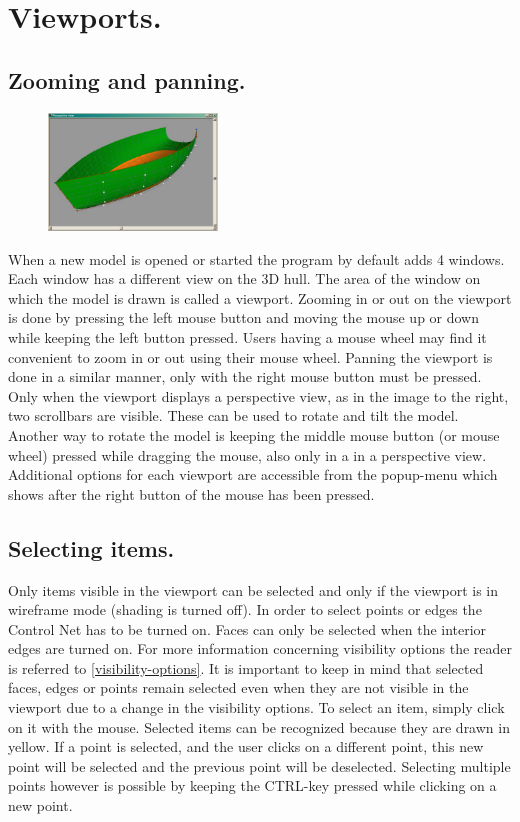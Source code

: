 \documentclass[12pt]{article}
\begin{document}
\section{Viewports.}

\subsection{Zooming and panning.}

\begin{figure}
        \centering
        \includegraphics[width=0.4\textwidth,natwidth=1024,natheight=715]{figure8.png}
        \caption{}
        \label{fig:viewport}
\end{figure}

When a new model is opened or started the program by default adds 4
windows. Each window has a different view on the 3D hull. The area of
the window on which the model is drawn is called a viewport. Zooming
in or out on the viewport is done by pressing the left mouse button
and moving the mouse up or down while keeping the left button pressed.
Users having a mouse wheel may find it convenient to zoom in or out
using their mouse wheel. Panning the viewport is done in a similar
manner, only with the right mouse button must be pressed. Only when
the viewport displays a perspective view, as in the image to the
right, two scrollbars are visible. These can be used to rotate and
tilt the model. Another way to rotate the model is keeping the middle
mouse button (or mouse wheel) pressed while dragging the mouse, also
only in a in a perspective view. Additional options for each viewport
are accessible from the popup-menu which shows after the right button
of the mouse has been pressed.

\subsection{Selecting items.}
Only items visible in the viewport can be selected and only if the
viewport is in wireframe mode (shading is turned off). In order to
select points or edges the Control Net has to be
turned on. Faces can only be selected when
the interior edges are turned on. For more
information concerning visibility options the reader is referred
to \ref{visibility-options}. It is important to keep in mind that
selected faces, edges or points remain selected even when they are not
visible in the viewport due to a change in the visibility options. To
select an item, simply click on it with the mouse. Selected items can
be recognized because they are drawn in yellow. If a point is
selected, and the user clicks on a different point, this new point
will be selected and the previous point will be deselected.  Selecting
multiple points however is possible by keeping the CTRL-key pressed
while clicking on a new point.
\end{document}
